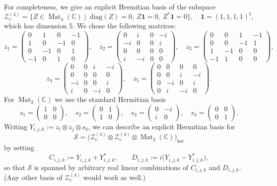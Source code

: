 \documentclass[11pt, a4paper]{article}
\theoremstyle{plain}
\theoremstyle{definition}
\theoremstyle{remark}
\newcommand{\C}{\mathbb{C}}
\newcommand{\Mat}[2]{\operatorname{Mat}_{#2}\!\left(#1\right)}
\begin{document}
For completeness, we give an explicit Hermitian basis of the subspace
\[
\mathcal{Z}^{(4)}_e=\{Z\in \Mat{\C}{4}\mid\ \mathrm{diag}(Z)=0,\ Z\mathbf{1}=0,\ Z^{*}\mathbf{1}=0\},
\quad \mathbf{1}=(1,1,1,1)^{\mathsf{t}},
\]
which has dimension \(5\).
We chose the following matrices:
\[
z_1=\begin{pmatrix}
0&1&0&-1\\[2pt] 1&0&-1&0\\[2pt] 0&-1&0&1\\[2pt] -1&0&1&0
\end{pmatrix},\quad
z_2=\begin{pmatrix}
0&i&0&-i\\[2pt] -i&0&0&i\\[2pt] 0&0&0&0\\[2pt] i&-i&0&0
\end{pmatrix},\quad
z_3=\begin{pmatrix}
0&0&1&-1\\[2pt] 0&0&-1&1\\[2pt] 1&-1&0&0\\[2pt] -1&1&0&0
\end{pmatrix},
\]
\[
z_4=\begin{pmatrix}
0&0&i&-i\\[2pt] 0&0&0&0\\[2pt] -i&0&0&i\\[2pt] i&0&-i&0
\end{pmatrix},\quad
z_5=\begin{pmatrix}
0&0&0&0\\[2pt] 0&0&i&-i\\[2pt] 0&-i&0&i\\[2pt] 0&i&-i&0
\end{pmatrix}.
\]
For \(\Mat{\C}{2}\) we use the standard Hermitian basis
\[
s_1=\begin{pmatrix}1&0\\0&0\end{pmatrix},\quad
s_2=\begin{pmatrix}0&1\\1&0\end{pmatrix},\quad
s_3=\begin{pmatrix}0&-i\\ i&0\end{pmatrix},\quad
s_4=\begin{pmatrix}0&0\\0&1\end{pmatrix}.
\]
Writing \(Y_{i,j,k}:=z_i\otimes z_j\otimes s_k\), we can describe an explicit Hermitian basis for
\[
\mathcal{S}=\big(\mathcal{Z}^{(4)}_e\otimes \mathcal{Z}^{(4)}_e\otimes \Mat{\C}{2}\big)_{\mathrm{her}}
\]
by setting
\[
C_{i,j,k}:=Y_{i,j,k}+Y_{i,j,k}^{*},\qquad
D_{i,j,k}:=i\big(Y_{i,j,k}-Y_{i,j,k}^{*}\big),
\]
so that \(\mathcal{S}\) is spanned by arbitrary real linear combinations of \(C_{i,j,k}\) and \(D_{i,j,k}\).
(Any other basis of \(\mathcal{Z}^{(4)}_e\) would work as well.)
\end{document}
